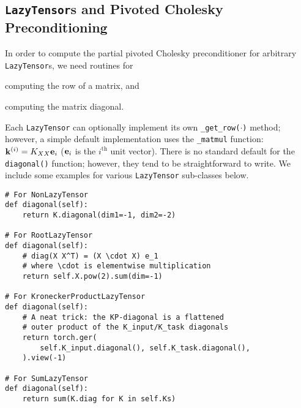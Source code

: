 \subsection{{\tt LazyTensor}s and Pivoted Cholesky Preconditioning}
In order to compute the partial pivoted Cholesky preconditioner for arbitrary {\tt LazyTensor}s, we need routines for
\begin{enumerate*}
  \item computing the row of a matrix, and
  \item computing the matrix diagonal.
\end{enumerate*}
%
Each {\tt LazyTensor} can optionally implement its own {\tt \_get\_row($\cdot$)} method; however, a simple default implementation uses the {\tt \_matmul} function:
$
  \mathbf{k}^{(i)} = K_{XX} \mathbf{e}_i
$
($\mathbf{e}_i$ is the $i^\text{th}$ unit vector).
There is no standard default for the {\tt diagonal()} function; however, they tend to be straightforward to write.
We include some examples for various {\tt LazyTensor} sub-classes below.
%
\begin{verbatim}
# For NonLazyTensor
def diagonal(self):
    return K.diagonal(dim1=-1, dim2=-2)

# For RootLazyTensor
def diagonal(self):
    # diag(X X^T) = (X \cdot X) e_1
    # where \cdot is elementwise multiplication
    return self.X.pow(2).sum(dim=-1)

# For KroneckerProductLazyTensor
def diagonal(self):
    # A neat trick: the KP-diagonal is a flattened
    # outer product of the K_input/K_task diagonals
    return torch.ger(
        self.K_input.diagonal(), self.K_task.diagonal(),
    ).view(-1)

# For SumLazyTensor
def diagonal(self):
    return sum(K.diag for K in self.Ks)
\end{verbatim}
